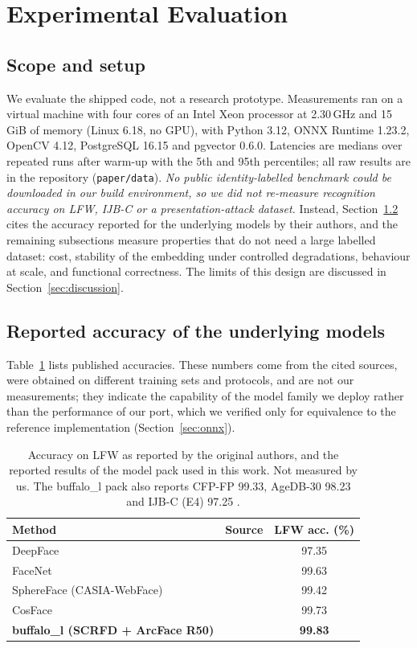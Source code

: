\documentclass[conference]{IEEEtran}
\begin{document}
\section{Experimental Evaluation}\label{sec:eval}
\subsection{Scope and setup}
We evaluate the shipped code, not a research prototype. Measurements ran on a virtual machine with four cores of an Intel Xeon processor at 2.30\,GHz and 15\,GiB of memory (Linux 6.18, no GPU), with Python 3.12, ONNX Runtime 1.23.2, OpenCV 4.12, PostgreSQL 16.15 and pgvector 0.6.0. Latencies are medians over repeated runs after warm-up with the 5th and 95th percentiles; all raw results are in the repository (\texttt{paper/data}). \emph{No public identity-labelled benchmark could be downloaded in our build environment, so we did not re-measure recognition accuracy on LFW, IJB-C or a presentation-attack dataset.} Instead, Section~\ref{sec:reported} cites the accuracy reported for the underlying models by their authors, and the remaining subsections measure properties that do not need a large labelled dataset: cost, stability of the embedding under controlled degradations, behaviour at scale, and functional correctness. The limits of this design are discussed in Section~\ref{sec:discussion}.

\subsection{Reported accuracy of the underlying models}\label{sec:reported}
Table~\ref{tab:reported} lists published accuracies. These numbers come from the cited sources, were obtained on different training sets and protocols, and are not our measurements; they indicate the capability of the model family we deploy rather than the performance of our port, which we verified only for equivalence to the reference implementation (Section~\ref{sec:onnx}).

\begin{table}[!t]
\caption{Accuracy on LFW as reported by the original authors, and the reported results of the model pack used in this work. Not measured by us. The buffalo\_l pack also reports CFP-FP 99.33, AgeDB-30 98.23 and IJB-C (E4) 97.25 \cite{insightface}.}
\label{tab:reported}
\centering
\small
\setlength{\tabcolsep}{5pt}
\begin{tabular}{@{}llc@{}}
\toprule
Method & Source & LFW acc. (\%)\\
\midrule
DeepFace & \cite{taigman2014} & 97.35\\
FaceNet & \cite{schroff2015} & 99.63\\
SphereFace (CASIA-WebFace) & \cite{liu2017sphereface} & 99.42\\
CosFace & \cite{wang2018cosface} & 99.73\\
\textbf{buffalo\_l (SCRFD + ArcFace R50)} & \cite{insightface} & \textbf{99.83}\\
\bottomrule
\end{tabular}
\end{table}
\end{document}
